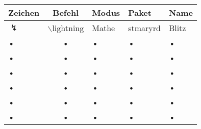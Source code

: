 \documentclass[11pt,a4paper]{scrartcl}
\begin{document}
\begin{table}
\centering
\begin{tabular}{|l|c|l|l|l|}
\hline
Zeichen & Befehl & Modus & Paket & Name \\
\hline
$\lightning$ & $\backslash$lightning & Mathe & stmaryrd & Blitz \\
• & • & • & • & • \\
• & • & • & • & • \\
• & • & • & • & • \\
• & • & • & • & • \\
• & • & • & • & • \\
• & • & • & • & • \\
\hline
\end{tabular} 
\end{table}
\end{document}
